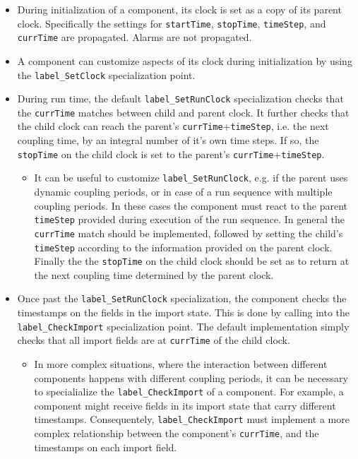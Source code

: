 \begin{itemize}
\item During initialization of a component, its clock is set as a copy of its parent clock. Specifically the settings for {\tt startTime}, {\tt stopTime}, {\tt timeStep}, and {\tt currTime} are propagated. Alarms are not propagated.
\item A component can customize aspects of its clock during initialization by using the {\tt label\_SetClock} specialization point.
\item During run time, the default {\tt label\_SetRunClock} specialization checks that the {\tt currTime} matches between child and parent clock. It further checks that the child clock can reach the parent's {\tt currTime}+{\tt timeStep}, i.e. the next coupling time, by an integral number of it's own time steps. If so, the {\tt stopTime} on the child clock is set to the parent's {\tt currTime}+{\tt timeStep}.
\begin{itemize}
\item It can be useful to customize {\tt label\_SetRunClock}, e.g. if the parent uses dynamic coupling periods, or in case of a run sequence with multiple coupling periods. In these cases the component must react to the parent {\tt timeStep} provided during execution of the run sequence. In general the {\tt currTime} match should be implemented, followed by setting the child's {\tt timeStep} according to the information provided on the parent clock. Finally the the {\tt stopTime} on the child clock should be set as to return at the next coupling time determined by the parent clock.
\end{itemize}
\item Once past the {\tt label\_SetRunClock} specialization, the component checks the timestamps on the fields in the import state. This is done by calling into the {\tt label\_CheckImport} specialization point. The default implementation simply checks that all import fields are at {\tt currTime} of the child clock. 
\begin{itemize}
\item In more complex situations, where the interaction between different components happens with different coupling periods, it can be necessary to specialialize the {\tt label\_CheckImport} of a component. For example, a component might receive fields in its import state that carry different timestamps. Consequentely, {\tt label\_CheckImport} must implement a more complex relationship between the component's {\tt currTime}, and the timestamps on each import field.

\end{itemize}
\end{itemize}
